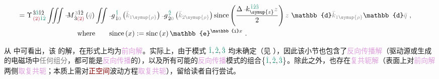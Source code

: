 \begin{subequations}
\begin{align}
	\hspace{-1.25em} &\hspace{-0.5em}= \Upsilon^{\;\! \hat{3} \textcolor{PineGreen}{\hat{3}} \hat{1} \hat{2} }_{\;\! \textcolor{Maroon}{(2)} \textcolor{PineGreen}{\hat{1} \hat{2}} } \iiint \xint{\mathcolor{gray}{-}}{18}{M}^{\;\! \mathcolor{gray}{3} \hat{1} \hat{2} }_{\;\! \hat{3} \textcolor{Maroon}{(2)} } \left( \mathcolor{gray}{\bar{q}} \right) \iint \xint{{}^{}_{\mathcolor{gray}{-}}}{10}{g}^{\;\! \textcolor{PineGreen}{\hat{1}}}_{\;\! \hat{1} \mathcolor{gray}{0}} \left( \mathcolor{gray}{\bar{k}_{1\symup{\rho}}} \right) \xint{{}^{}_{\mathcolor{gray}{-}}}{10}{g}^{\;\! \textcolor{PineGreen}{\hat{2}}}_{\;\! \hat{2} \mathcolor{gray}{0}} \left( \mathcolor{gray}{\bar{k}_{2\symup{\rho}}} \right) \text{since} \left( \frac{ \Delta \xint{\begin{smallmatrix} ~ \\ {}^{}_{\mathcolor{gray}{-}} \\ ~ \end{smallmatrix}}{15}{k}_{\symup{z}}^{\;\! \textcolor{PineGreen}{\hat{1} \hat{2} \hat{3}} } \mathcolor{gray}{z} }{ 2 } \right) \mathcolor{gray}{z} ~ \mathbb{d} \mathcolor{gray}{\bar{k}_{1\symup{\rho}}} \mathbb{d} \mathcolor{gray}{\bar{q}} ~, \label{eq:up-scalar-g-EE-312-discrete-since2} \\
	\hspace{-1.25em} &\hspace{8em} \text{where} ~~~~~~ \text{since} \left( x \right) := \text{sinc} \left( x \right) \mathbb{e}^{\mathbb{i} x } ~. \label{eq:up-scalar-g-EE-312-discrete-since3}
\end{align}
\end{subequations}

从  中可看出，该  的解，在形式上均为\textcolor{Plum}{前向解}。实际上，由于\textcolor{PineGreen}{模式} $\textcolor{PineGreen}{\hat{1}}, \textcolor{PineGreen}{\hat{2}},\textcolor{PineGreen}{\hat{3}}$ 均未确定（见 ），因此该小节也包含了\textcolor{Plum}{反向传播解}（\textcolor{NavyBlue}{驱动源}或生成的电磁场中\textcolor{gray}{任何组分}，都可能是\textcolor{Plum}{反向传播}的），以及所有可能的\textcolor{Plum}{反向传播}\textcolor{PineGreen}{模式}的组合$\left\{ \textcolor{PineGreen}{\hat{1}}, \textcolor{PineGreen}{\hat{2}},\textcolor{PineGreen}{\hat{3}} \right\}$。除此之外，也存在\textcolor{Plum}{复共轭解}（表面上对\textcolor{Plum}{前向解}两侧\textcolor{Plum}{取复共轭}；本质上需对\textcolor{Maroon}{正空间}波动方程\textcolor{Plum}{取复共轭}），留给读者自行尝试。

